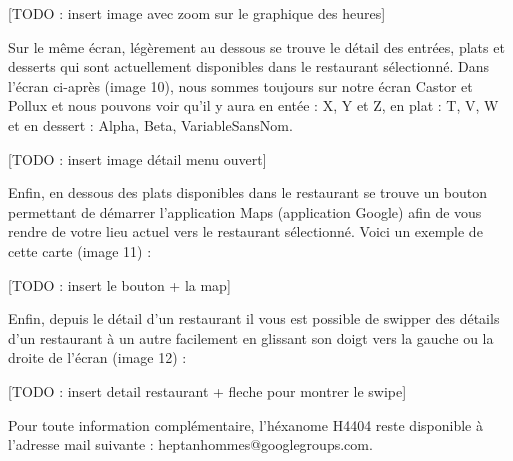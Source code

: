 [TODO : insert image avec zoom sur le graphique des heures]

Sur le même écran, légèrement au dessous se trouve le détail des entrées,
plats et desserts qui sont actuellement disponibles dans le restaurant
sélectionné. Dans l’écran ci-après (image 10), nous sommes toujours sur
notre écran Castor et Pollux et nous pouvons voir qu’il y aura en entée : 
X, Y et Z, en plat : T, V, W et en dessert : Alpha, Beta, VariableSansNom. 

[TODO : insert image détail menu ouvert]

Enfin, en dessous des plats disponibles dans le restaurant se trouve un
bouton permettant de démarrer l’application Maps (application Google) afin de
vous rendre de votre lieu actuel vers le restaurant sélectionné. Voici un exemple
de cette carte (image 11) :

[TODO : insert le bouton + la map]  

Enfin, depuis le détail d’un restaurant il vous est possible de swipper des 
détails d’un restaurant à un autre facilement en glissant son doigt vers la
gauche ou la droite de l’écran (image 12) : 

[TODO : insert detail restaurant + fleche pour montrer le swipe]

Pour toute information complémentaire, l’héxanome H4404 reste disponible
à l’adresse mail suivante : heptanhommes@googlegroups.com. 